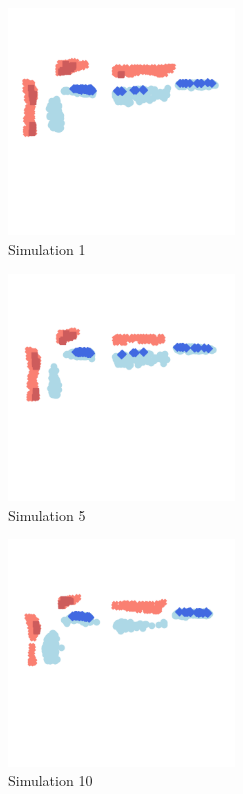 \documentclass[final,5p,times,twocolumn,authoryear]{elsarticle}
\begin{document}
\begin{figure}[!ht]
  \centering
      \includegraphics[width=6cm]{Battle_1.png}
      \caption{Simulation 1}
      \label{fig:Simulation}
  \centering
\end{figure}

\begin{figure}[!ht]
  \centering
      \includegraphics[width=6cm]{Battle_2.png}
      \caption{Simulation 5}
      \label{fig:Simulation}
  \centering
\end{figure}

\begin{figure}[!ht]
  \centering
      \includegraphics[width=6cm]{Battle_3.png}
      \caption{Simulation 10}
      \label{fig:Simulation}
  \centering
\end{figure}
\end{document}
